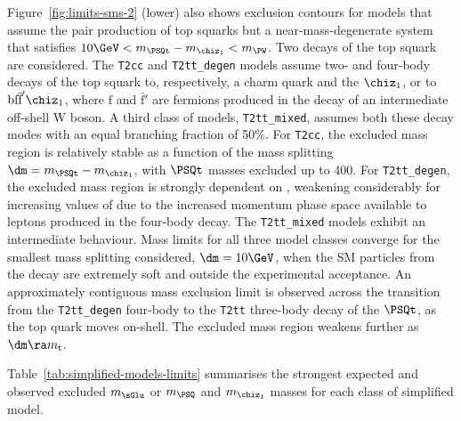Figure~\ref{fig:limits-sms-2} (lower) also shows exclusion contours
for models that assume the pair production of top squarks but a
near-mass-degenerate system that satisfies $10\GeV < m_{\PSQt} -
m_{\chiz_1} < m_\PW$. Two decays of the top squark are
considered. 
The \texttt{T2cc} and \texttt{T2tt\_degen} models assume two- and
four-body decays of the top squark to, respectively, a charm quark and
the $\chiz_1$, or to $\text{bf}\bar{\text{f}}'\chiz_1$, where
$\text{f}$ and $\bar{\text{f}}'$ are fermions produced in the decay of
an intermediate off-shell W boson. A third class of models,
\texttt{T2tt\_mixed}, assumes both these decay modes with an equal
branching fraction of 50\%. For \texttt{T2cc}, the excluded mass
region is relatively stable as a function of the mass splitting $\dm =
m_{\PSQt} - m_{\chiz_1}$, with $\PSQt$ masses excluded up to
400\GeV. For \texttt{T2tt\_degen}, the excluded mass region is
strongly dependent on \dm, weakening considerably for increasing
values of \dm due to the increased momentum phase space available to
leptons produced in the four-body decay. The \texttt{T2tt\_mixed}
models exhibit an intermediate behaviour. Mass limits for all three
model classes converge for the smallest mass splitting considered,
$\dm = 10\GeV$, when the SM particles from the \PSQt decay are
extremely soft and outside the experimental acceptance. An
approximately contiguous mass exclusion limit is observed across the
transition from the \texttt{T2tt\_degen} four-body to the
\texttt{T2tt} three-body decay of the $\PSQt$, as the top quark moves
on-shell. The excluded mass region weakens further as $\dm \ra
m_\text{t}$.

Table~\ref{tab:simplified-models-limits} summarises the strongest
expected and observed excluded $m_{\sGlu}$ or $m_{\PSQ}$ and
$m_{\chiz_1}$ masses for each class of simplified model.

